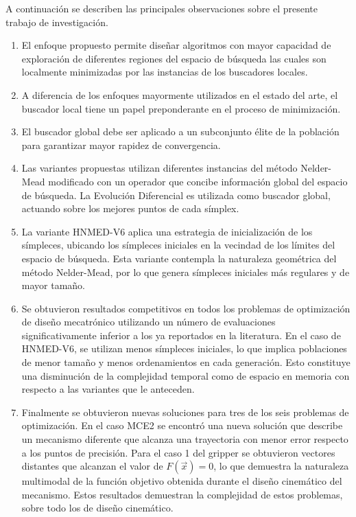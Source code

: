 A continuación se describen las principales observaciones sobre el presente trabajo de investigación.
\begin{enumerate}
	\item El enfoque propuesto permite diseñar algoritmos con mayor capacidad de exploración de diferentes regiones del espacio de búsqueda las cuales son localmente minimizadas por las instancias de los buscadores locales.
	\item A diferencia de los enfoques mayormente utilizados en el estado del arte, el buscador local tiene un papel preponderante en el proceso de minimización.
	\item El buscador global debe ser aplicado a un subconjunto élite de la población para garantizar mayor rapidez de convergencia.
	 \item Las variantes propuestas utilizan diferentes instancias del método Nelder-Mead modificado con un operador que concibe información global del espacio de búsqueda. La Evolución Diferencial es utilizada como buscador global, actuando sobre los mejores puntos de cada símplex.
	 \item La variante HNMED-V6 aplica una estrategia de inicialización de los símpleces, ubicando los símpleces iniciales en la vecindad de los límites del espacio de búsqueda. Esta variante contempla la naturaleza geométrica del método Nelder-Mead, por lo que genera símpleces iniciales más regulares y de mayor tamaño. 
	 \item Se obtuvieron resultados competitivos en todos los problemas de optimización de diseño mecatrónico utilizando un número de evaluaciones significativamente inferior a los ya reportados en la literatura. En el caso de HNMED-V6, se utilizan menos símpleces iniciales, lo que implica poblaciones de menor tamaño y menos ordenamientos en cada generación. Esto constituye una disminución de la complejidad temporal como de espacio en memoria con respecto a las variantes que le anteceden.
	 
	 \item Finalmente se obtuvieron nuevas soluciones para tres de los seis problemas de optimización. En el  caso MCE2 se encontró una nueva solución que describe un mecanismo diferente que alcanza una trayectoria con menor error respecto a los puntos de precisión. Para el caso 1 del gripper se obtuvieron vectores distantes que alcanzan el valor de $F(\vec{x})=0$, lo que demuestra la naturaleza multimodal de la función objetivo obtenida durante el diseño cinemático del mecanismo. Estos resultados demuestran la complejidad de estos problemas, sobre todo los de diseño cinemático. 
	 
\end{enumerate}  
	 
